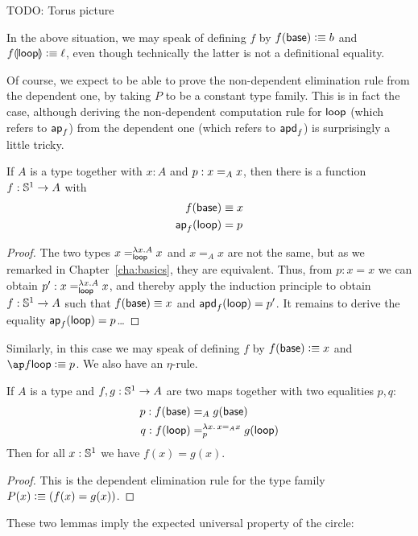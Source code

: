 TODO: Torus picture

In the above situation, we may speak of defining $f$ by $f(\base)\defeq b$ and $\apd f \lloop \defeq \ell$, even though technically the latter is not a definitional equality.

Of course, we expect to be able to prove the non-dependent elimination rule from the dependent one, by taking $P$ to be a constant type family.
This is in fact the case, although deriving the non-dependent computation rule for $\lloop$ (which refers to $\apfunc f$) from the dependent one (which refers to $\apdfunc f$) is surprisingly a little tricky.

\begin{lem}
  If $A$ is a type together with $x:A$ and $p:\id[A]xx$, then there is a
  function $f:\Sn^1\to{}A$ with
  \begin{align*}
    f(\base)&\jdeq x \\
    \apfunc f(\lloop)&=p
  \end{align*}
\end{lem}
\begin{proof}
  The two types $x=^{\lambda{}x.A}_\lloop{}x$ and $x=_Ax$ are not the same, but as we remarked in Chapter~\ref{cha:basics}, they are equivalent.
  Thus, from $p:x=x$ we can obtain $p':x=^{\lambda{}x.A}_\lloop{}x$, and thereby apply the induction principle to obtain $f:\Sn^1\to A$ such that $f(\base)\jdeq x$ and $\apdfunc f(\lloop) = p'$.
  It remains to derive the equality $\apfunc f(\lloop)=p$\dots
\end{proof}

Similarly, in this case we may speak of defining $f$ by $f(\base)\defeq x$ and $\ap f \lloop \defeq p$.
We also have an $\eta$-rule.

\begin{lem}
  If $A$ is a type and $f,g:\Sn^1\to{}A$ are two maps together with two
  equalities $p,q$:
  \begin{align*}
    p:f(\base)&=_Ag(\base)\\
    q:\map{f}\lloop&=^{\lambda{}x.\,x=_Ax}_p\map{g}\lloop
  \end{align*}
  Then for all $x:\Sn^1$ we have $f(x)=g(x)$.
\end{lem}
\begin{proof}
  This is the dependent elimination rule for the type family $P(x)\defeq(f(x)=g(x))$.
\end{proof}

These two lemmas imply the expected universal property of the circle:

